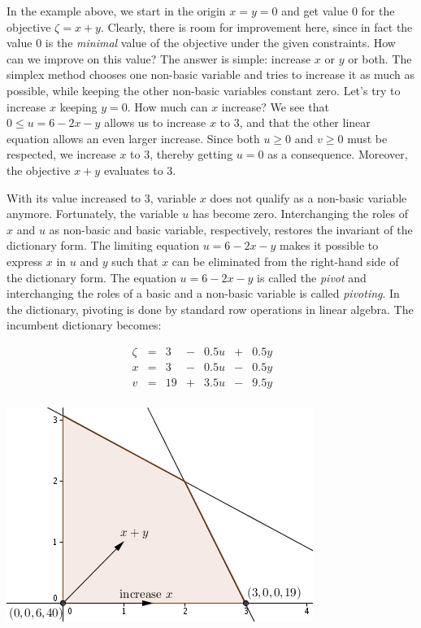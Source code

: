\documentclass[ukenglish]{nik}
\begin{document}
In the example above, we start in the origin $x=y=0$ and get
value $0$ for the objective $\zeta = x + y$.
Clearly, there is room for improvement here, since in fact
the value $0$ is the \emph{minimal} value of the objective
under the given constraints. How can we improve on this
value? The answer is simple: increase $x$ or $y$ or both.
The simplex method chooses one non-basic variable and
tries to increase it as much as possible, while keeping the
other non-basic variables constant zero.
Let's try to increase $x$ keeping $y=0$. How much can $x$ increase?
We see that $0 \leq u = 6 -2x-y$ allows us to increase $x$ to $3$,
and that the other linear equation allows an even larger increase. Since both
$u\geq 0$ and $v\geq 0$ must be respected, we increase $x$ to $3$,
thereby getting $u=0$ as a consequence. Moreover, the objective $x+y$ evaluates to 3.

With its value increased to $3$, variable $x$ does not qualify as a non-basic variable anymore.
Fortunately, the variable $u$ has become zero. Interchanging the roles of
$x$ and $u$ as non-basic and basic variable, respectively, restores 
the invariant of the dictionary form. The limiting equation $u = 6 -2x-y$ makes it
possible to express $x$ in $u$ and $y$ such that $x$ can be eliminated from the
right-hand side of the dictionary form. The equation $u = 6 -2x-y$ is
called the \emph{pivot} and interchanging the roles of
a basic and a non-basic variable is called \emph{pivoting}.
In the dictionary, pivoting is done by standard row operations in linear algebra. 
The incumbent dictionary becomes:

	\begin{minipage}{.45\textwidth}
\[    
    \begin{array}{lcrcrcrcr}
      \zeta&=& 3 &-& 0.5 u &+& 0.5 y & &  \\\hline
      x    &=& 3 &-& 0.5 u &-& 0.5 y & &  \\
      v    &=& 19&+& 3.5 u &-& 9.5 y & &  \\

    \end{array}
\]
\end{minipage}
	\begin{minipage}{.45\textwidth}
				\includegraphics{ex2.jpg}
\end{minipage}
\vspace{.2cm}
\end{document}
